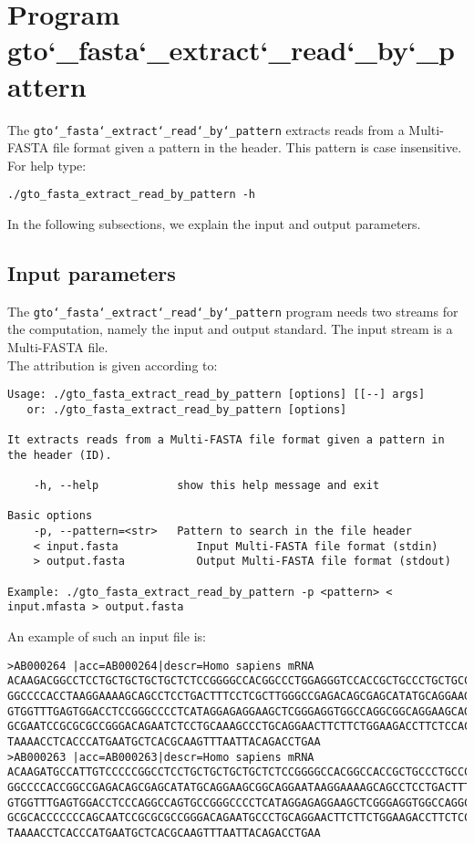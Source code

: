 \section{Program gto\char`_fasta\char`_extract\char`_read\char`_by\char`_pattern}
The \texttt{gto\char`_fasta\char`_extract\char`_read\char`_by\char`_pattern} extracts reads from a Multi-FASTA file format given a pattern in the header. This pattern is case insensitive. \\
For help type:
\begin{lstlisting}
./gto_fasta_extract_read_by_pattern -h
\end{lstlisting}
In the following subsections, we explain the input and output parameters.

\subsection*{Input parameters}

The \texttt{gto\char`_fasta\char`_extract\char`_read\char`_by\char`_pattern} program needs two streams for the computation, namely the input and output standard. The input stream is a Multi-FASTA file.\\
The attribution is given according to:
\begin{lstlisting}
Usage: ./gto_fasta_extract_read_by_pattern [options] [[--] args]
   or: ./gto_fasta_extract_read_by_pattern [options]

It extracts reads from a Multi-FASTA file format given a pattern in the header (ID).

    -h, --help            show this help message and exit

Basic options
    -p, --pattern=<str>   Pattern to search in the file header
    < input.fasta            Input Multi-FASTA file format (stdin)
    > output.fasta           Output Multi-FASTA file format (stdout)

Example: ./gto_fasta_extract_read_by_pattern -p <pattern> < input.mfasta > output.fasta
\end{lstlisting}
An example of such an input file is:
\begin{lstlisting}
>AB000264 |acc=AB000264|descr=Homo sapiens mRNA 
ACAAGACGGCCTCCTGCTGCTGCTGCTCTCCGGGGCCACGGCCCTGGAGGGTCCACCGCTGCCCTGCTGCCATTGTCCCC
GGCCCCACCTAAGGAAAAGCAGCCTCCTGACTTTCCTCGCTTGGGCCGAGACAGCGAGCATATGCAGGAAGCGGCAGGAA
GTGGTTTGAGTGGACCTCCGGGCCCCTCATAGGAGAGGAAGCTCGGGAGGTGGCCAGGCGGCAGGAAGCAGGCCAGTGCC
GCGAATCCGCGCGCCGGGACAGAATCTCCTGCAAAGCCCTGCAGGAACTTCTTCTGGAAGACCTTCTCCACCCCCCCAGC
TAAAACCTCACCCATGAATGCTCACGCAAGTTTAATTACAGACCTGAA
>AB000263 |acc=AB000263|descr=Homo sapiens mRNA 
ACAAGATGCCATTGTCCCCCGGCCTCCTGCTGCTGCTGCTCTCCGGGGCCACGGCCACCGCTGCCCTGCCCCTGGAGGGT
GGCCCCACCGGCCGAGACAGCGAGCATATGCAGGAAGCGGCAGGAATAAGGAAAAGCAGCCTCCTGACTTTCCTCGCTTG
GTGGTTTGAGTGGACCTCCCAGGCCAGTGCCGGGCCCCTCATAGGAGAGGAAGCTCGGGAGGTGGCCAGGCGGCAGGAAG
GCGCACCCCCCCAGCAATCCGCGCGCCGGGACAGAATGCCCTGCAGGAACTTCTTCTGGAAGACCTTCTCCTCCTGCAAA
TAAAACCTCACCCATGAATGCTCACGCAAGTTTAATTACAGACCTGAA
\end{lstlisting}

